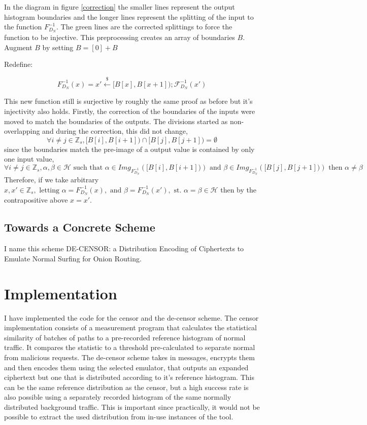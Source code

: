 \documentclass[10pt,a4paper]{article}
\begin{document}
In the diagram in figure \ref{correction} the smaller lines represent the output histogram boundaries and the longer lines represent the splitting of the input to the function $F^{-1}_{D_N}$.
The green lines are the corrected splittings to force the function to be injective. This preprocessing creates an array of boundaries $B$. Augment $B$ by setting $B = [0] + B$

Redefine:

$$F^{-1}_{D_N}(x) = x' \xleftarrow{\$} [B[x], B[x+1]); \mathcal{F}^{-1}_{D_N}(x')$$

This new function still is surjective by roughly the same proof as before but it's injectivity also holds.
Firstly, the correction of the boundaries of the inputs were moved to match the boundaries of the outputs.
The divisions started as non-overlapping and during the correction, this did not change, 
$$\forall i \neq j \in \mathbb{Z}_s, \big[ B[i],B[i+1] \big) \cap \big[ B[j],B[j+1] \big) = \emptyset$$
since the boundaries match the pre-image of a output value is contained by only one input value,
$$ \forall i \neq j \in \mathbb{Z}_s, \alpha,\beta \in \mathcal{H} \text{ such that } \alpha \in Img_{F^{-1}_{D_N}}(\big[ B[i],B[i+1] \big)) \text{ and } \beta \in Img_{F^{-1}_{D_N}}(\big[ B[j],B[j+1] \big)) \text{ then } \alpha \neq \beta$$
Therefore, if we take arbitrary $x, x' \in \mathbb{Z}_s, \text{ letting } \alpha = F^{-1}_{D_N}(x), \text{ and } \beta = F^{-1}_{D_N}(x'), \text{ st. } \alpha = \beta \in \mathcal{H}$ then by the contrapositive above $x=x'$.

\subsection{Towards a Concrete Scheme}

I name this scheme DE-CENSOR: a Distribution Encoding of Ciphertexts to Emulate Normal Surfing for Onion Routing.


\pagebreak
\section{Implementation}


I have implemented the code for the censor and the de-censor scheme. The censor implementation consists of a measurement program that calculates the statistical similarity of batches of paths to a pre-recorded reference histogram of normal traffic. It compares the statistic to a threshold pre-calculated to separate normal from malicious requests. The de-censor scheme takes in messages, encrypts them and then encodes them using the selected emulator, that outputs an expanded ciphertext but one that is distributed according to it's reference histogram. This can be the same reference distribution as the censor, but a high success rate is also possible using a separately recorded histogram of the same normally distributed background traffic. This is important since practically, it would not be possible to extract the used distribution from in-use instances of the tool.
\end{document}

